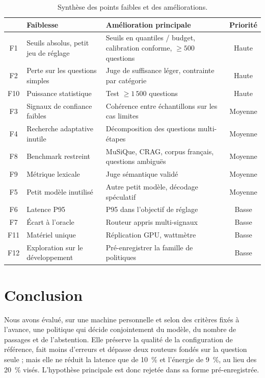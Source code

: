 \documentclass[11pt,a4paper]{article}
\begin{document}
\begin{table}[H]
\centering\small
\begin{tabularx}{\linewidth}{c Y Y c}
\toprule
& Faiblesse & Amélioration principale & Priorité \\
\midrule
F1 & Seuils absolus, petit jeu de réglage & Seuils en quantiles / budget, calibration conforme, $\ge 500$ questions & Haute \\
F2 & Perte sur les questions simples & Juge de suffisance léger, contrainte par catégorie & Haute \\
F10 & Puissance statistique & Test $\ge 1\,500$ questions & Haute \\
F3 & Signaux de confiance faibles & Cohérence entre échantillons sur les cas limites & Moyenne \\
F4 & Recherche adaptative inutile & Décomposition des questions multi-étapes & Moyenne \\
F8 & Benchmark restreint & MuSiQue, CRAG, corpus français, questions ambiguës & Moyenne \\
F9 & Métrique lexicale & Juge sémantique validé & Moyenne \\
F5 & Petit modèle inutilisé & Autre petit modèle, décodage spéculatif & Moyenne \\
F6 & Latence P95 & P95 dans l'objectif de réglage & Basse \\
F7 & Écart à l'oracle & Routeur appris multi-signaux & Basse \\
F11 & Matériel unique & Réplication GPU, wattmètre & Basse \\
F12 & Exploration sur le développement & Pré-enregistrer la famille de politiques & Basse \\
\bottomrule
\end{tabularx}
\caption{Synthèse des points faibles et des améliorations.}
\label{tab:faiblesses}
\end{table}

\section{Conclusion}\label{sec:conclusion}

Nous avons évalué, sur une machine personnelle et selon des critères fixés à l'avance, une politique
qui décide conjointement du modèle, du nombre de passages et de l'abstention. Elle préserve la qualité
de la configuration de référence, fait moins d'erreurs et dépasse deux routeurs fondés sur la question
seule ; mais elle ne réduit la latence que de 10~\% et l'énergie de 9~\%, au lieu des 20~\% visés.
L'hypothèse principale est donc rejetée dans sa forme pré-enregistrée.
\end{document}
